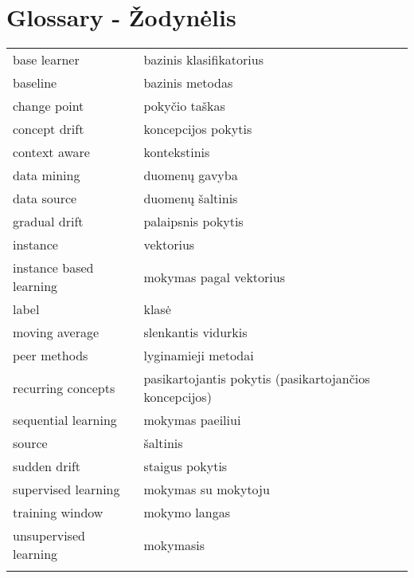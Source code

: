 
\chapter*{Glossary - \v{Z}odyn\.elis}
\label{cha:glossary}

\noindent
 \begin{longtable}[l]{ p{4cm} p{7cm} } %
    base learner   &  bazinis klasifikatorius \\
    baseline       &  bazinis metodas \\
    change point   &  poky\v{c}io ta\v{s}kas  \\
    concept drift  &  koncepcijos pokytis \\
    context aware  &  kontekstinis  \\
    data mining    &  duomen\k{u} gavyba \\ 
    data source    &  duomen\k{u} \v{s}altinis \\
    gradual drift  &  palaipsnis pokytis  \\
    instance       &  vektorius \\
    instance based learning &  mokymas pagal vektorius \\ 
    label          &  klas\.e \\
    moving average &  slenkantis vidurkis \\ 
    peer methods   &  lyginamieji metodai  \\
    recurring concepts  &  pasikartojantis pokytis (pasikartojan\v{c}ios koncepcijos)  \\
    sequential learning &  mokymas paeiliui  \\
    source         &  \v{s}altinis  \\
    sudden drift   &  staigus pokytis  \\
    supervised learning   &  mokymas su mokytoju  \\
    training window       &  mokymo langas  \\
    unsupervised learning &  mokymasis  \\
    \label{tab:vocabulary}
\end{longtable}

